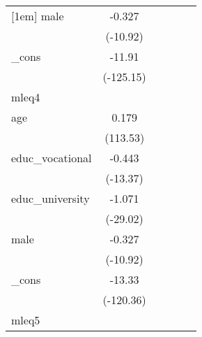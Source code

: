 {\begin{tabular}{l*{5}{c}}
[1em]
male        &      -0.327\sym{***}&                     &                     &                     &                     \\
            &    (-10.92)         &                     &                     &                     &                     \\
[1em]
\_cons      &      -11.91\sym{***}&                     &                     &                     &                     \\
            &   (-125.15)         &                     &                     &                     &                     \\
\hline
mleq4       &                     &                     &                     &                     &                     \\
age         &       0.179\sym{***}&                     &                     &                     &                     \\
            &    (113.53)         &                     &                     &                     &                     \\
[1em]
educ\_vocational&      -0.443\sym{***}&                     &                     &                     &                     \\
            &    (-13.37)         &                     &                     &                     &                     \\
[1em]
educ\_university&      -1.071\sym{***}&                     &                     &                     &                     \\
            &    (-29.02)         &                     &                     &                     &                     \\
[1em]
male        &      -0.327\sym{***}&                     &                     &                     &                     \\
            &    (-10.92)         &                     &                     &                     &                     \\
[1em]
\_cons      &      -13.33\sym{***}&                     &                     &                     &                     \\
            &   (-120.36)         &                     &                     &                     &                     \\
\hline
mleq5       &                     &                     &                     &                     &                     \\

\end{tabular}}
